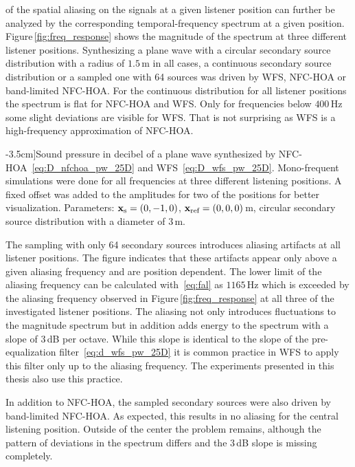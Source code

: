  of the spatial aliasing on the signals at a given
listener position can further be analyzed by the corresponding temporal-frequency
spectrum at a given position.
Figure\,\ref{fig:freq_response} shows the magnitude of the spectrum at
three different listener positions. Synthesizing a plane wave
with a circular secondary source distribution with a radius of $1.5$\,m in all
cases, a continuous secondary source distribution or a sampled one with 64 sources was
driven by \ac{WFS}, \ac{NFC-HOA} or band-limited \ac{NFC-HOA}. For the
continuous distribution for all listener positions the spectrum is flat
for \ac{NFC-HOA} and \ac{WFS}. Only for frequencies below $400$\,Hz some slight
deviations are visible for \ac{WFS}. That is not surprising as \ac{WFS} is a
high-frequency approximation of \ac{NFC-HOA}.
%
\begin{figure*}[t]
    \small
    
    \caption[][-3.5cm]{Sound pressure in decibel of a plane wave synthesized by
    \ac{NFC-HOA}~\protect\eqref{eq:D_nfchoa_pw_25D} and
    \ac{WFS}~\protect\eqref{eq:D_wfs_pw_25D}. Mono-frequent simulations were
    done for all frequencies at three different listening positions. A fixed
    offset was added to the amplitudes for two of the positions for better
    visualization.
    Parameters: $\mathbf{x}_\text{s} = (0,-1,0)$, $\mathbf{x}_\text{ref} = (0,0,0)$\,m, circular secondary
    source distribution with a diameter of $3$\,m.
    }
    \label{fig:freq_response}
\end{figure*}
%

The sampling with only 64 secondary sources introduces aliasing artifacts at all listener
positions. The figure indicates that these artifacts appear only above a given
aliasing frequency and are position dependent. The lower limit of the aliasing
frequency can be calculated with~\eqref{eq:fal} as $1165$\,Hz
which is exceeded by the aliasing frequency observed in
Figure\,\ref{fig:freq_response}
at all three of the investigated listener positions. The
aliasing not only introduces fluctuations to the magnitude spectrum but
in addition adds energy to the spectrum with a slope of $3$\,dB per octave.
While
this slope is identical to the slope of the pre-equalization
filter~\eqref{eq:d_wfs_pw_25D} it is common practice in \ac{WFS} to apply this
filter only up to the aliasing frequency. The experiments presented in this
thesis also use this practice.

In addition to \ac{NFC-HOA}, the sampled secondary sources were also driven by
band-limited \ac{NFC-HOA}. As expected, this results in no aliasing for the
central listening position. Outside of the center the problem remains, although
the pattern of deviations in the spectrum differs and the $3$\,dB slope is
missing completely.

